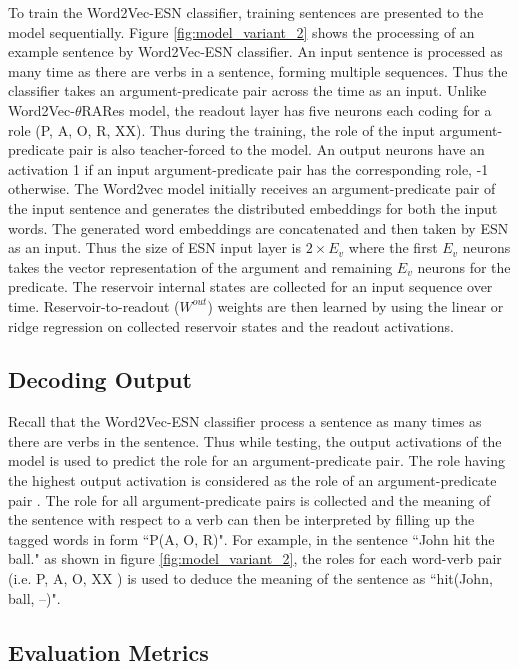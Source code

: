 To train the Word2Vec-ESN classifier, training sentences are presented to the model sequentially. Figure \ref{fig:model_variant_2} shows the processing of an example sentence by Word2Vec-ESN classifier. An input sentence is processed as many time as there are verbs in a sentence, forming multiple sequences. Thus the classifier takes an argument-predicate pair across the time as an input. Unlike Word2Vec-$\theta$RARes model, the readout layer has five neurons each coding for a role (P, A, O, R, XX). Thus during the training, the role of the input argument-predicate pair is also teacher-forced to the model. An output neurons have an activation 1 if an input argument-predicate pair has the corresponding role, -1 otherwise. The Word2vec model initially receives an argument-predicate pair of the input sentence and generates the distributed embeddings for both the input words. The generated word embeddings are concatenated and then taken by ESN as an input. Thus the size of ESN input layer is $2 \times E_{v}$ where the first $E_{v}$ neurons takes the vector representation of the argument and remaining $E_{v}$ neurons for the predicate. The reservoir internal states are collected for an input sequence over time. Reservoir-to-readout ($W^{out}$) weights are then learned by using the linear or ridge regression on collected reservoir states and the readout activations. 

\subsection{Decoding Output}

Recall that the Word2Vec-ESN classifier process a sentence as many times as there are verbs in the sentence. Thus while testing, the output activations of the model is used to predict the role for an argument-predicate pair. The role having the highest output activation is considered as the role of an argument-predicate pair \cite{survey_multi_class}. The role for all argument-predicate pairs is collected and the meaning of the sentence with respect to a verb can then be interpreted by filling up the tagged words in form ``P(A, O, R)". For example, in the sentence ``John hit the ball." as shown in figure \ref{fig:model_variant_2}, the roles for each word-verb pair (i.e. P, A, O, XX ) is used to deduce the meaning of the sentence as ``hit(John, ball, --)".

\subsection{Evaluation Metrics}\label{sec:evaluation_metrics_2}


